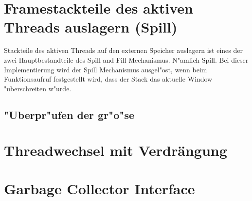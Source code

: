 \section{Framestackteile des aktiven Threads auslagern (Spill)}

Stackteile des aktiven Threads auf den externen Speicher auslagern ist eines der zwei Hauptbestandteile des Spill and Fill Mechanismus. N"amlich Spill. Bei dieser Implementierung wird der Spill Mechanismus ausgel"ost, wenn beim Funktionsaufruf festgestellt wird, dass der Stack das aktuelle Window "uberschreiten w"urde.

\subsection{"Uberpr"ufen der gr"o"se}


\section{Threadwechsel mit Verdr\"angung}
\section{Garbage Collector Interface}